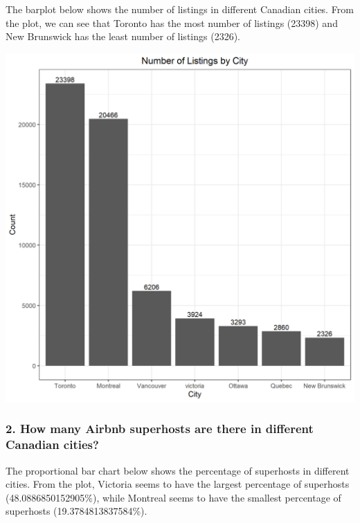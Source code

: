 \documentclass[
]{article}
\begin{document}
The barplot below shows the number of listings in different Canadian
cities. From the plot, we can see that Toronto has the most number of
listings (23398) and New Brunswick has the least number of listings
(2326).

\includegraphics{../Images/Number_of_listings.png}

\hypertarget{how-many-airbnb-superhosts-are-there-in-different-canadian-cities}{%
\subsubsection{2. How many Airbnb superhosts are there in different
Canadian
cities?}\label{how-many-airbnb-superhosts-are-there-in-different-canadian-cities}}

The proportional bar chart below shows the percentage of superhosts in
different cities. From the plot, Victoria seems to have the largest
percentage of superhosts (48.0886850152905\%), while Montreal seems to
have the smallest percentage of superhosts (19.3784813837584\%).
\end{document}
